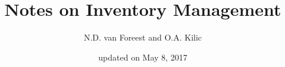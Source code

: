 \documentclass[a4paper,11pt]{scrartcl}
\title{Notes on Inventory Management}
\date{\small updated on May 8, 2017}
\author{\small N.D. van Foreest and O.A. Kilic}
\begin{document}
\maketitle
{\small \tableofcontents}

\newpage 




%
%
\end{document}
